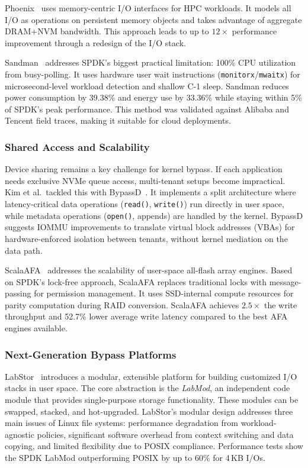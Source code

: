 \documentclass[conference]{IEEEtran}
\begin{document}
Phoenix~\cite{li2017phoenix} uses memory-centric I/O interfaces for HPC workloads. It models all I/O as operations on persistent memory objects and takes advantage of aggregate DRAM+NVM bandwidth. This approach leads to up to $12\times$ performance improvement through a redesign of the I/O stack.

Sandman~\cite{zhou2025sandman} addresses SPDK's biggest practical limitation: 100\% CPU utilization from busy-polling. It uses hardware user wait instructions (\texttt{monitorx}/\texttt{mwaitx}) for microsecond-level workload detection and shallow C-1 sleep. Sandman reduces power consumption by 39.38\% and energy use by 33.36\% while staying within 5\% of SPDK's peak performance. This method was validated against Alibaba and Tencent field traces, making it suitable for cloud deployments.

\subsubsection{Shared Access and Scalability}
\label{sec:shared}

Device sharing remains a key challenge for kernel bypass. If each application needs exclusive NVMe queue access, multi-tenant setups become impractical. Kim et al.\ tackled this with BypassD~\cite{yadalam2024bypassd}. It implements a split architecture where latency-critical data operations (\texttt{read()}, \texttt{write()}) run directly in user space, while metadata operations (\texttt{open()}, appends) are handled by the kernel. BypassD suggests IOMMU improvements to translate virtual block addresses (VBAs) for hardware-enforced isolation between tenants, without kernel mediation on the data path.

ScalaAFA~\cite{lee2023scalaafa} addresses the scalability of user-space all-flash array engines. Based on SPDK's lock-free approach, ScalaAFA replaces traditional locks with message-passing for permission management. It uses SSD-internal compute resources for parity computation during RAID conversion. ScalaAFA achieves $2.5\times$ the write throughput and 52.7\% lower average write latency compared to the best AFA engines available.

\subsubsection{Next-Generation Bypass Platforms}
\label{sec:nextgen}

LabStor~\cite{lukken2022labstor} introduces a modular, extensible platform for building customized I/O stacks in user space. The core abstraction is the \emph{LabMod}, an independent code module that provides single-purpose storage functionality. These modules can be swapped, stacked, and hot-upgraded. LabStor's modular design addresses three main issues of Linux file systems: performance degradation from workload-agnostic policies, significant software overhead from context switching and data copying, and limited flexibility due to POSIX compliance. Performance tests show the SPDK LabMod outperforming POSIX by up to 60\% for 4\,KB I/Os.
\end{document}
